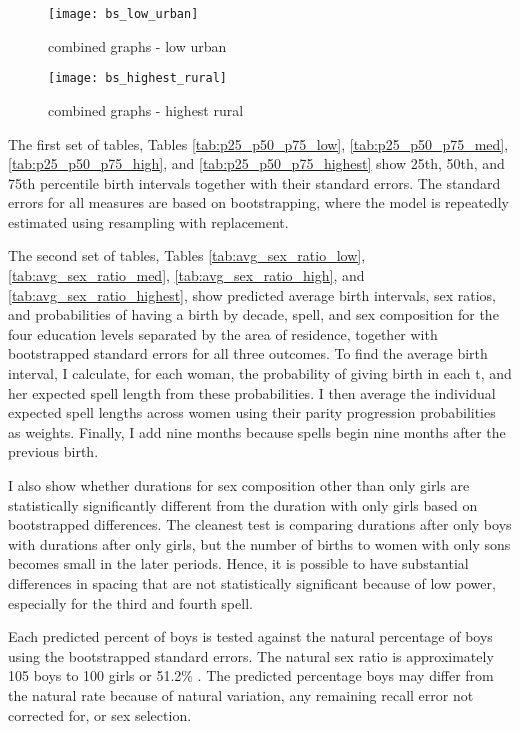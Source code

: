 \documentclass[12pt,letterpaper]{article}
\begin{document}
\begin{figure}
\centering
\texttt{[image: bs\_low\_urban]}
\caption{combined graphs - low urban}
\label{fig:spacing_low_urban}
\end{figure}

\begin{figure}
\centering
\texttt{[image: bs\_highest\_rural]}
\caption{combined graphs - highest rural}
\label{fig:spacing_highest_rural}
\end{figure}



The first set of tables, Tables \ref{tab:p25_p50_p75_low}, \ref{tab:p25_p50_p75_med},
\ref{tab:p25_p50_p75_high}, and \ref{tab:p25_p50_p75_highest} show 25th, 50th, and
75th percentile birth intervals together with their standard errors.
The standard errors for all measures are based on bootstrapping,
where the model is repeatedly estimated using resampling with replacement.

The second set of tables, 
Tables \ref{tab:avg_sex_ratio_low}, \ref{tab:avg_sex_ratio_med}, 
\ref{tab:avg_sex_ratio_high}, and \ref{tab:avg_sex_ratio_highest}, show predicted average 
birth intervals, sex ratios, and probabilities of having a birth by decade, spell, and sex 
composition for the four education levels separated by the area of residence, together 
with bootstrapped standard errors for all three outcomes.
To find the average birth interval, I calculate, for each woman, the probability of 
giving birth in each t, and her expected spell length from these probabilities. 
I then average the individual expected spell lengths across women using their parity 
progression probabilities as weights. Finally, I add nine months because spells begin 
nine months after the previous birth.

I also show whether durations for sex composition other than only girls are statistically 
significantly different from the duration with only girls based on bootstrapped 
differences. 
The cleanest test is comparing durations after only boys with durations after
only girls, but the number of births to women with only sons becomes small 
in the later periods.
Hence, it is possible to have substantial differences in spacing that are
not statistically significant because of low power, especially for the third 
and fourth spell.

Each predicted percent of boys is tested against the natural percentage of
boys using the bootstrapped standard errors.
The natural sex ratio is approximately 105 boys to 100 girls or
51.2\% \citep{ben-porath76b,jacobsen99,Portner2015b}.
The predicted percentage boys may differ from the natural rate because of 
natural variation, any remaining recall error not corrected for, or 
sex selection. 
\end{document}
